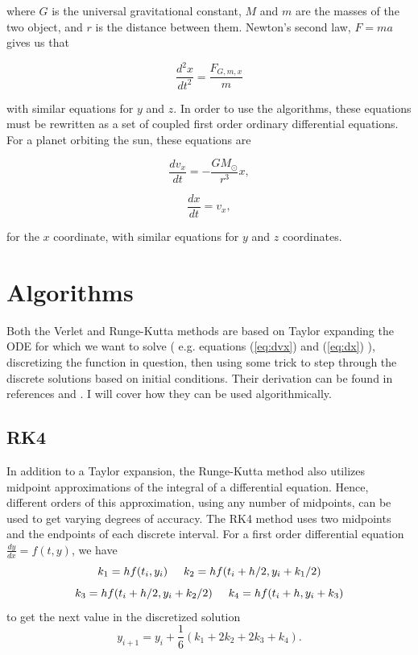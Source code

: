 \documentclass[a4paper,12pt]{report}
\begin{document}
where $G$ is the universal gravitational constant, $M$ and $m$ are the masses of the two object, and $r$ is the distance between them. Newton's second law, $F = ma$ gives us that

\begin{equation}\label{eq:nsl}
 \frac{d^2x}{dt^2} = \frac{F_{G,m,x}}{m}
\end{equation}

with similar equations for $y$ and $z$. In order to use the algorithms, these equations must be rewritten as a set of coupled first order ordinary differential equations. For a planet orbiting the sun, these equations are

\begin{equation}\label{eq:dvx}
   \frac{dv_x}{dt}=-\frac{GM_{\odot}}{r^3}x,
\end{equation}

\begin{equation}\label{eq:dx}
   \frac{dx}{dt}=v_x,
\end{equation}

for the $x$ coordinate, with similar equations for $y$ and $z$ coordinates.

\section{Algorithms}\label{sec:alg}

  Both the Verlet and Runge-Kutta methods are based on Taylor expanding the ODE for which we want to solve ( e.g. equations (\ref{eq:dvx}) and (\ref{eq:dx}) ), discretizing the function in question, then using some trick to step through the discrete solutions based on initial conditions. Their derivation can be found in references \cite{Landau:2008} and \cite{Dux:2016}. I will cover how they can be used algorithmically.

\subsection{RK4}
In addition to a Taylor expansion, the Runge-Kutta method also utilizes midpoint approximations of the integral of a differential equation. Hence, different orders of this approximation, using any number of midpoints, can be used to get varying degrees of accuracy. The RK4 method uses two midpoints and the endpoints of each discrete interval. For a first order differential equation $\frac{dy}{dx} = f(t,y)$, we have
\[
  k_1=hf(t_i,y_i) \hspace{0.5cm}   k_2=hf(t_i+h/2,y_i+k_1/2)
\]
\[
  k_3=hf(t_i+h/2,y_i+k_2/2)\hspace{0.5cm}   k_4=hf(t_i+h,y_i+k_3)
  \]
to get the next value in the discretized solution
\begin{equation}
  y_{i+1}=y_i +\frac{1}{6}\left( k_1 +2k_2+2k_3+k_4\right).
\end{equation}
\end{document}
